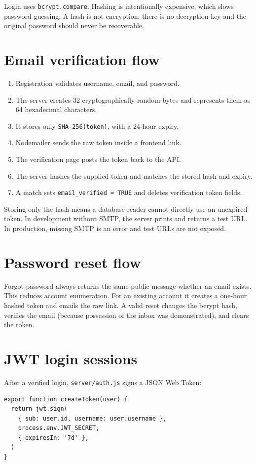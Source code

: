 \documentclass[11pt,oneside]{book}
\newcommand{\file}[1]{\texttt{#1}}
\newcommand{\code}[1]{\texttt{#1}}
\begin{document}
Login uses \code{bcrypt.compare}. Hashing is intentionally expensive, which slows password guessing. A hash is not encryption: there is no decryption key and the original password should never be recoverable.

\section{Email verification flow}
\begin{enumerate}
  \item Registration validates username, email, and password.
  \item The server creates 32 cryptographically random bytes and represents them as 64 hexadecimal characters.
  \item It stores only \code{SHA-256(token)}, with a 24-hour expiry.
  \item Nodemailer sends the raw token inside a frontend link.
  \item The verification page posts the token back to the API.
  \item The server hashes the supplied token and matches the stored hash and expiry.
  \item A match sets \code{email\_verified = TRUE} and deletes verification token fields.
\end{enumerate}

Storing only the hash means a database reader cannot directly use an unexpired token. In development without SMTP, the server prints and returns a test URL. In production, missing SMTP is an error and test URLs are not exposed.

\section{Password reset flow}
Forgot-password always returns the same public message whether an email exists. This reduces account enumeration. For an existing account it creates a one-hour hashed token and emails the raw link. A valid reset changes the bcrypt hash, verifies the email (because possession of the inbox was demonstrated), and clears the token.

\section{JWT login sessions}
After a verified login, \file{server/auth.js} signs a JSON Web Token:

\begin{lstlisting}[title={server/auth.js, shortened}]
export function createToken(user) {
  return jwt.sign(
    { sub: user.id, username: user.username },
    process.env.JWT_SECRET,
    { expiresIn: '7d' },
  )
}
\end{lstlisting}
\end{document}
